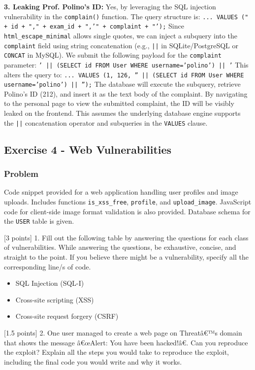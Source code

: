 \documentclass{article}
\begin{document}
\textbf{3. Leaking Prof. Polino's ID:}
Yes, by leveraging the SQL injection vulnerability in the \texttt{complain()} function. The query structure is:
\texttt{... VALUES (" + id + "," + exam\_id + ",'" + complaint + "');}
Since \texttt{html\_escape\_minimal} allows single quotes, we can inject a subquery into the \texttt{complaint} field using string concatenation (e.g., \texttt{||} in SQLite/PostgreSQL or \texttt{CONCAT} in MySQL).
We submit the following payload for the \texttt{complaint} parameter:
\texttt{' || (SELECT id FROM User WHERE username='polino') || '}
This alters the query to:
\texttt{... VALUES (1, 126, '' || (SELECT id FROM User WHERE username='polino') || '');}
The database will execute the subquery, retrieve Polino's ID (212), and insert it as the text body of the complaint. By navigating to the personal page to view the submitted complaint, the ID will be visibly leaked on the frontend. This assumes the underlying database engine supports the \texttt{||} concatenation operator and subqueries in the \texttt{VALUES} clause.

\subsection{Exercise 4 - Web Vulnerabilities}
\subsubsection*{Problem}
Code snippet provided for a web application handling user profiles and image uploads. Includes functions \texttt{is\_xss\_free}, \texttt{profile}, and \texttt{upload\_image}. JavaScript code for client-side image format validation is also provided. Database schema for the \texttt{USER} table is given.

[3 points] 1. Fill out the following table by answering the questions for each class of vulnerabilities. While answering the questions, be exhaustive, concise, and straight to the point. If you believe there might be a vulnerability, specify all the corresponding line/s of code.
\begin{itemize}
    \item SQL Injection (SQL-I)
    \item Cross-site scripting (XSS)
    \item Cross-site request forgery (CSRF)

\end{itemize}
[1.5 points] 2. One user managed to create a web page on Threatâ€™s domain that shows the message â€œAlert: You have been hacked!â€. Can you reproduce the exploit? Explain all the steps you would take to reproduce the exploit, including the final code you would write and why it works.
\end{document}
